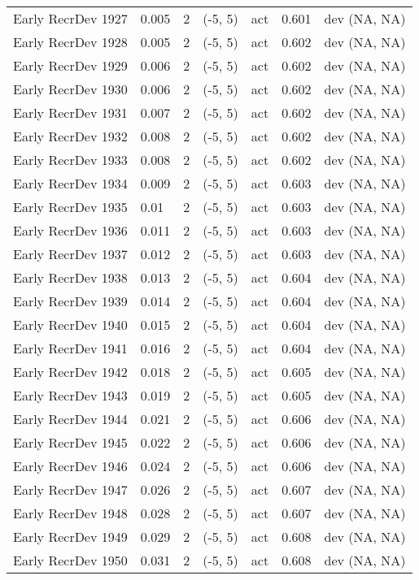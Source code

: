 \documentclass[11pt,
  english,
  letterpaper,
]{article}
\begin{document}
\begin{landscape}
\begin{longtable}[t]{>{\raggedright\arraybackslash}p{7.5cm}lllll>{\raggedright\arraybackslash}p{3.5cm}}
Early RecrDev 1927 & 0.005 & 2 & (-5, 5) & act & 0.601 & dev (NA, NA)\\
Early RecrDev 1928 & 0.005 & 2 & (-5, 5) & act & 0.602 & dev (NA, NA)\\
Early RecrDev 1929 & 0.006 & 2 & (-5, 5) & act & 0.602 & dev (NA, NA)\\
Early RecrDev 1930 & 0.006 & 2 & (-5, 5) & act & 0.602 & dev (NA, NA)\\
Early RecrDev 1931 & 0.007 & 2 & (-5, 5) & act & 0.602 & dev (NA, NA)\\
Early RecrDev 1932 & 0.008 & 2 & (-5, 5) & act & 0.602 & dev (NA, NA)\\
Early RecrDev 1933 & 0.008 & 2 & (-5, 5) & act & 0.602 & dev (NA, NA)\\
Early RecrDev 1934 & 0.009 & 2 & (-5, 5) & act & 0.603 & dev (NA, NA)\\
Early RecrDev 1935 & 0.01 & 2 & (-5, 5) & act & 0.603 & dev (NA, NA)\\
Early RecrDev 1936 & 0.011 & 2 & (-5, 5) & act & 0.603 & dev (NA, NA)\\
Early RecrDev 1937 & 0.012 & 2 & (-5, 5) & act & 0.603 & dev (NA, NA)\\
Early RecrDev 1938 & 0.013 & 2 & (-5, 5) & act & 0.604 & dev (NA, NA)\\
Early RecrDev 1939 & 0.014 & 2 & (-5, 5) & act & 0.604 & dev (NA, NA)\\
Early RecrDev 1940 & 0.015 & 2 & (-5, 5) & act & 0.604 & dev (NA, NA)\\
Early RecrDev 1941 & 0.016 & 2 & (-5, 5) & act & 0.604 & dev (NA, NA)\\
Early RecrDev 1942 & 0.018 & 2 & (-5, 5) & act & 0.605 & dev (NA, NA)\\
Early RecrDev 1943 & 0.019 & 2 & (-5, 5) & act & 0.605 & dev (NA, NA)\\
Early RecrDev 1944 & 0.021 & 2 & (-5, 5) & act & 0.606 & dev (NA, NA)\\
Early RecrDev 1945 & 0.022 & 2 & (-5, 5) & act & 0.606 & dev (NA, NA)\\
Early RecrDev 1946 & 0.024 & 2 & (-5, 5) & act & 0.606 & dev (NA, NA)\\
Early RecrDev 1947 & 0.026 & 2 & (-5, 5) & act & 0.607 & dev (NA, NA)\\
Early RecrDev 1948 & 0.028 & 2 & (-5, 5) & act & 0.607 & dev (NA, NA)\\
Early RecrDev 1949 & 0.029 & 2 & (-5, 5) & act & 0.608 & dev (NA, NA)\\
Early RecrDev 1950 & 0.031 & 2 & (-5, 5) & act & 0.608 & dev (NA, NA)\\

\end{longtable}
\end{landscape}
\end{document}
